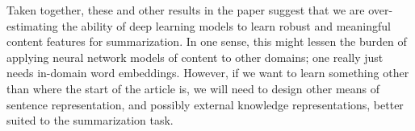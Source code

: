 \noindent
Taken together, these and other results in the paper suggest that we are 
over-estimating the ability of deep learning models to learn robust and 
meaningful content features for summarization.  %
In one sense, this might lessen the burden of applying neural network models
of  content to other domains; one really just needs in-domain word embeddings.
However, if we want to learn something other than where the start of 
the article is, we will need to design other means of sentence representation,
and possibly external knowledge representations, better suited to the summarization task.







